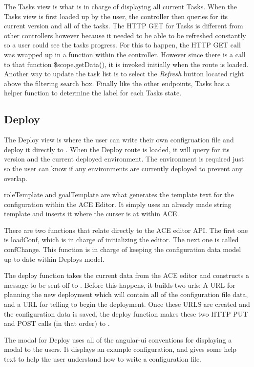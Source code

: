 The Tasks view is what is in charge of displaying all current \ancor{} Tasks. When the Tasks view is first loaded up by the user, the controller then queries \ancor{} for its current version and all of the tasks. The HTTP GET for Tasks is different from other controllers however because it needed to be able to be refreshed constantly so a user could see the tasks progress. For this to happen, the HTTP GET call was wrapped up in a function within the controller. However since there is a call to that function \$scope.getData(), it is invoked initially when the route is loaded. Another way to update the task list is to select the \emph{Refresh} button located right above the filtering search box. Finally like the other endpoints, Tasks has a helper function to determine the label for each Tasks state.

\subsection{Deploy}

The Deploy view is where the user can write their own configruation file and deploy it directly to \ancor{}. When the Deploy route is loaded, it will query \ancor{} for its version and the current deployed environment. The environment is required just so the user can know if any environments are currently deployed to prevent any overlap.

roleTemplate and goalTemplate are what generates the template text for the configuration within the ACE Editor. It simply uses an already made string template and inserts it where the curser is at within ACE.

There are two functions that relate directly to the ACE editor API. The first one is loadConf, which is in charge of initializing the editor. The next one is called confChange. This function is in charge of keeping the configuration data model up to date within Deploys model.

The deploy function takes the current data from the ACE editor and constructs a message to be sent off to \ancor{}. Before this happens, it builds two urls: A URL for planning the new deployment which will contain all of the configuration file data, and a URL for telling \ancor{} to begin the deployment. Once these URLS are created and the configuration data is saved, the deploy function makes these two HTTP PUT and POST calls (in that order) to \ancor{}.

The modal for Deploy uses all of the angular-ui conventions for displaying a modal to the users. It displays an example configuration, and gives some help text to help the user understand how to write a configuration file.
